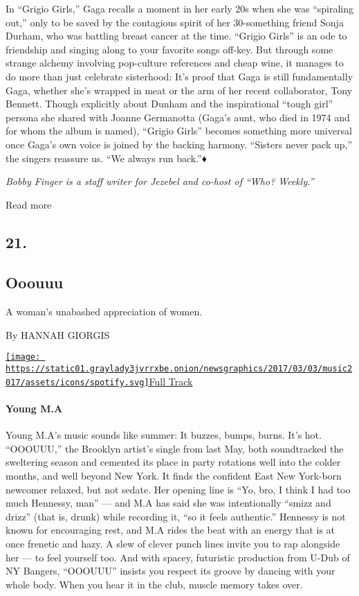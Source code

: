 In ``Grigio Girls,'' Gaga recalls a moment in her early 20s when she was
``spiraling out,'' only to be saved by the contagious spirit of her
30-something friend Sonja Durham, who was battling breast cancer at the
time. ``Grigio Girls'' is an ode to friendship and singing along to your
favorite songs off-key. But through some strange alchemy involving
pop-culture references and cheap wine, it manages to do more than just
celebrate sisterhood: It's proof that Gaga is still fundamentally Gaga,
whether she's wrapped in meat or the arm of her recent collaborator,
Tony Bennett. Though explicitly about Dunham and the inspirational
``tough girl'' persona she shared with Joanne Germanotta (Gaga's aunt,
who died in 1974 and for whom the album is named), ``Grigio Girls''
becomes something more universal once Gaga's own voice is joined by the
backing harmony. ``Sisters never pack up,'' the singers reassure us.
``We always run back.''♦

\emph{Bobby Finger is a staff writer for Jezebel and co-host of ``Who?
Weekly.''}

Read more

\hypertarget{21}{%
\subsection{21.}\label{21}}

\hypertarget{--ooouuu}{%
\subsection{\texorpdfstring{ Ooouuu}{  Ooouuu}}\label{--ooouuu}}

A woman's unabashed appreciation of women.

By HANNAH GIORGIS

\href{https://open.spotify.com/track/0D21XvHcVsIvJM6FcGY2BT}{\texttt{[image: https://static01.graylady3jvrrxbe.onion/newsgraphics/2017/03/03/music2017/assets/icons/spotify.svg]}Full
Track}

\hypertarget{young-ma}{%
\paragraph{Young M.A}\label{young-ma}}

Young M.A's music sounds like summer: It buzzes, bumps, burns. It's hot.
``OOOUUU,'' the Brooklyn artist's single from last May, both
soundtracked the sweltering season and cemented its place in party
rotations well into the colder months, and well beyond New York. It
finds the confident East New York-born newcomer relaxed, but not sedate.
Her opening line is ``Yo, bro, I think I had too much Hennessy, man''
--- and M.A has said she was intentionally ``smizz and drizz'' (that is,
drunk) while recording it, ``so it feels authentic.'' Hennessy is not
known for encouraging rest, and M.A rides the beat with an energy that
is at once frenetic and hazy. A slew of clever punch lines invite you to
rap alongside her --- to feel yourself too. And with spacey, futuristic
production from U-Dub of NY Bangers, ``OOOUUU'' insists you respect its
groove by dancing with your whole body. When you hear it in the club,
muscle memory takes over.

